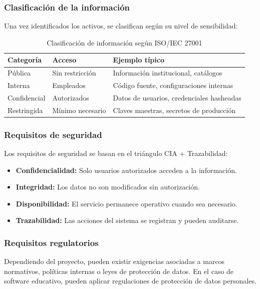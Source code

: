 \subsubsection{Clasificación de la información}

Una vez identificados los activos, se clasifican según su nivel de sensibilidad:

\begin{table}[h]
\centering
\small
\begin{tabular}{|l|l|p{6cm}|}
\hline
\textbf{Categoría} & \textbf{Acceso} & \textbf{Ejemplo típico} \\
\hline
Pública & Sin restricción & Información institucional, catálogos \\
Interna & Empleados & Código fuente, configuraciones internas \\
Confidencial & Autorizados & Datos de usuarios, credenciales hasheadas \\
Restringida & Mínimo necesario & Claves maestras, secretos de producción \\
\hline
\end{tabular}
\caption{Clasificación de información según ISO/IEC 27001}
\label{tab:clasificacion}
\end{table}

\subsubsection{Requisitos de seguridad}

Los requisitos de seguridad se basan en el triángulo CIA + Trazabilidad:

\begin{itemize}
    \item \textbf{Confidencialidad:} Solo usuarios autorizados acceden a la información.
    \item \textbf{Integridad:} Los datos no son modificados sin autorización.
    \item \textbf{Disponibilidad:} El servicio permanece operativo cuando sea necesario.
    \item \textbf{Trazabilidad:} Las acciones del sistema se registran y pueden auditarse.
\end{itemize}

\subsubsection{Requisitos regulatorios}

Dependiendo del proyecto, pueden existir exigencias asociadas a marcos normativos, políticas internas o leyes de protección de datos. En el caso de software educativo, pueden aplicar regulaciones de protección de datos personales.

